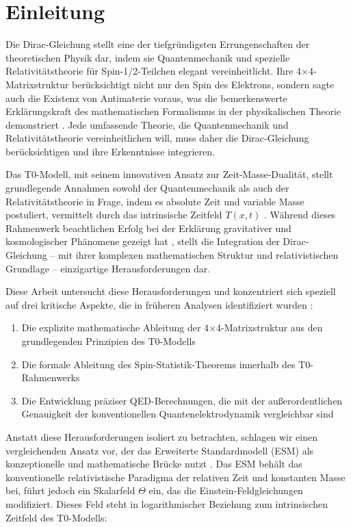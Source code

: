 \documentclass[12pt,a4paper]{article}
\newcommand{\Tfieldt}{T(x,t)}
\begin{document}
	\section{Einleitung}
	\label{sec:introduction}
	
	Die Dirac-Gleichung stellt eine der tiefgründigsten Errungenschaften der theoretischen Physik dar, indem sie Quantenmechanik und spezielle Relativitätstheorie für Spin-1/2-Teilchen elegant vereinheitlicht. Ihre 4$\times$4-Matrixstruktur berücksichtigt nicht nur den Spin des Elektrons, sondern sagte auch die Existenz von Antimaterie voraus, was die bemerkenswerte Erklärungskraft des mathematischen Formalismus in der physikalischen Theorie demonstriert \cite{dirac1928}. Jede umfassende Theorie, die Quantenmechanik und Relativitätstheorie vereinheitlichen will, muss daher die Dirac-Gleichung berücksichtigen und ihre Erkenntnisse integrieren.
	
	Das T0-Modell, mit seinem innovativen Ansatz zur Zeit-Masse-Dualität, stellt grundlegende Annahmen sowohl der Quantenmechanik als auch der Relativitätstheorie in Frage, indem es absolute Zeit und variable Masse postuliert, vermittelt durch das intrinsische Zeitfeld $\Tfieldt$ \cite{pascher_part1_2025, pascher_quantum_2025}. Während dieses Rahmenwerk beachtlichen Erfolg bei der Erklärung gravitativer und kosmologischer Phänomene gezeigt hat \cite{pascher_emergente_2025, pascher_galaxies_2025}, stellt die Integration der Dirac-Gleichung – mit ihrer komplexen mathematischen Struktur und relativistischen Grundlage – einzigartige Herausforderungen dar.
	
	Diese Arbeit untersucht diese Herausforderungen und konzentriert sich speziell auf drei kritische Aspekte, die in früheren Analysen identifiziert wurden \cite{pascher_pragmatic_2025}:
	
	\begin{enumerate}
		\item Die explizite mathematische Ableitung der 4$\times$4-Matrixstruktur aus den grundlegenden Prinzipien des T0-Modells
		\item Die formale Ableitung des Spin-Statistik-Theorems innerhalb des T0-Rahmenwerks
		\item Die Entwicklung präziser QED-Berechnungen, die mit der außerordentlichen Genauigkeit der konventionellen Quantenelektrodynamik vergleichbar sind
	\end{enumerate}
	
	Anstatt diese Herausforderungen isoliert zu betrachten, schlagen wir einen vergleichenden Ansatz vor, der das Erweiterte Standardmodell (ESM) als konzeptionelle und mathematische Brücke nutzt \cite{pascher_standardmod_2025, pascher_esm_comparison_2025}. Das ESM behält das konventionelle relativistische Paradigma der relativen Zeit und konstanten Masse bei, führt jedoch ein Skalarfeld $\Theta$ ein, das die Einstein-Feldgleichungen modifiziert. Dieses Feld steht in logarithmischer Beziehung zum intrinsischen Zeitfeld des T0-Modells:
	
\end{document}
